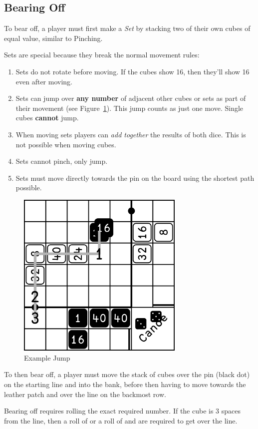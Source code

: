 \subsection{Bearing Off}\label{sec:bearing-off}
To bear off, a player must first make a \textit{Set} by stacking two of their own cubes of equal value, similar to Pinching.

Sets are special because they break the normal movement rules:
\begin{enumerate}
    \item Sets do not rotate before moving. If the cubes show 16, then they'll show 16 even after moving.
    \item Sets can jump over \textbf{any number} of adjacent other cubes or sets as part of their movement (see Figure~\ref{fig:jump}). This jump counts as just one move. Single cubes \textbf{cannot} jump.
    \item When moving sets players can \textit{add together} the results of both dice. This is not possible when moving cubes.
    \item Sets cannot pinch, only jump.
    \item Sets must move directly towards the pin on the board using the shortest path possible.
\end{enumerate}
\begin{figure}[!h]
    \centering
    \includegraphics[width=8cm]{../graphics/jump}
    \caption{Example Jump}
    \label{fig:jump}
\end{figure}
To then bear off, a player must move the stack of cubes over the pin (black dot) on the starting line and into the bank, before then having to move towards the leather patch and over the line on the backmost row.

Bearing off requires rolling the exact required number. If the cube is 3 spaces from the line, then a roll of  or a roll of  and  are required to get over the line.

